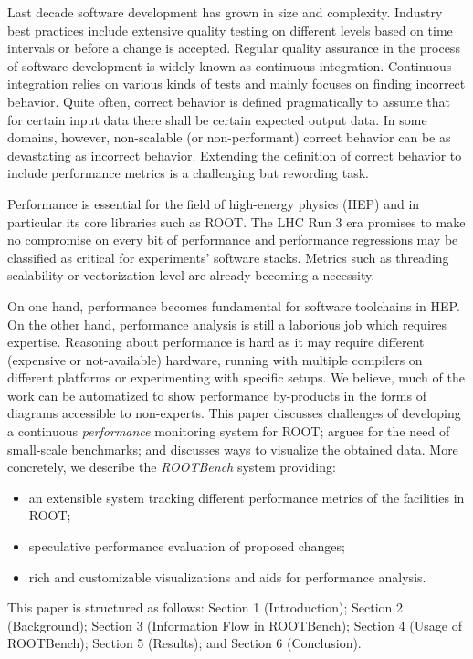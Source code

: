 \documentclass{webofc}
\begin{document}
Last decade software development has grown in size and complexity. Industry best practices include extensive quality testing on different levels based on time intervals or before a change is accepted. Regular quality assurance in the process of software development is widely known as continuous integration. Continuous integration relies on various kinds of tests and mainly focuses on finding incorrect behavior. Quite often, correct behavior is defined pragmatically to assume that for certain input data there shall be certain expected output data. In some domains, however, non-scalable (or non-performant) correct behavior can be as devastating as incorrect behavior. Extending the definition of correct behavior to include performance metrics is a challenging but rewording task.

Performance is essential for the field of high-energy physics (HEP) and in particular its core libraries such as ROOT. The LHC Run 3 era promises to make no compromise on every bit of performance and performance regressions may be classified as critical for experiments' software stacks. Metrics such as threading scalability or vectorization level are already becoming a necessity.

On one hand, performance becomes fundamental for software toolchains in HEP. On the other hand, performance analysis is still a laborious job which requires expertise. Reasoning about performance is hard as it may require different (expensive or not-available) hardware, running with multiple compilers on different platforms or experimenting with specific setups. We believe, much of the work can be automatized to show performance by-products in the forms of diagrams accessible to non-experts. This paper discusses challenges of developing a continuous \textit{performance} monitoring system for ROOT; argues for the need of small-scale benchmarks; and discusses ways to visualize the obtained data. More concretely, we describe the \textit{ROOTBench} system providing:
\begin{itemize}
\item an extensible system tracking different performance metrics of the facilities in ROOT;
\item speculative performance evaluation of proposed changes;
\item rich and customizable visualizations and aids for performance analysis.
\end{itemize}

This paper is structured as follows: Section 1 (Introduction); Section 2 (Background); Section 3 (Information Flow in ROOTBench); Section 4 (Usage of ROOTBench); Section 5 (Results); and Section 6 (Conclusion).
 
\end{document}
